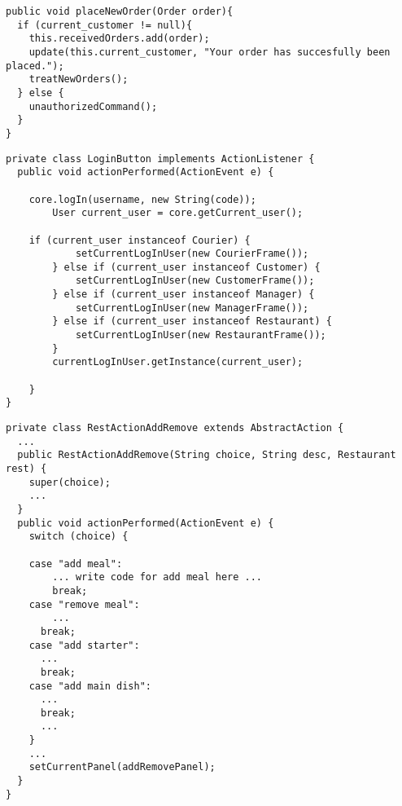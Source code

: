 \begin{lstlisting}[caption=Method to place an \texttt{Order} of \texttt{Core}.,
label=lst:placeOrder]
public void placeNewOrder(Order order){
  if (current_customer != null){
  	this.receivedOrders.add(order);
  	update(this.current_customer, "Your order has succesfully been placed.");
  	treatNewOrders();
  } else {
  	unauthorizedCommand();
  }
}
\end{lstlisting}

\begin{lstlisting}[caption=Strategy pattern to log in user.,
   label=lst:login_user_GUI] 
private class LoginButton implements ActionListener {
  public void actionPerformed(ActionEvent e) {

  	core.logIn(username, new String(code));
    	User current_user = core.getCurrent_user();

  	if (current_user instanceof Courier) {
    		setCurrentLogInUser(new CourierFrame());
    	} else if (current_user instanceof Customer) {
    		setCurrentLogInUser(new CustomerFrame());
    	} else if (current_user instanceof Manager) {
    		setCurrentLogInUser(new ManagerFrame());
    	} else if (current_user instanceof Restaurant) {
    		setCurrentLogInUser(new RestaurantFrame());
    	}
    	currentLogInUser.getInstance(current_user);
    	
    }
}
\end{lstlisting}

\begin{lstlisting}[caption=Nested action classes in restaurant.,
   label=lst:nested_class_rest] 
private class RestActionAddRemove extends AbstractAction {
  ...
  public RestActionAddRemove(String choice, String desc, Restaurant rest) {
  	super(choice);
  	...
  }
  public void actionPerformed(ActionEvent e) {
    switch (choice) {
        
    case "add meal":
    	... write code for add meal here ...
    	break;
    case "remove meal":
    	... 
      break;
    case "add starter":  
      ...
      break;
    case "add main dish":    
      ...
      break;
      ...
    }
    ...
    setCurrentPanel(addRemovePanel);
  }
}
\end{lstlisting}

\lstset{basicstyle=\rm\small\ttfamily}
